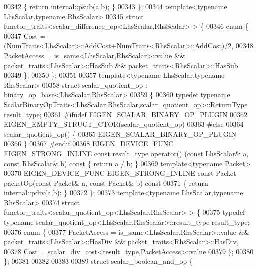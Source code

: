 \begin{DoxyCode}
00342 \textcolor{keyword}{  }\{ \textcolor{keywordflow}{return} internal::psub(a,b); \}
00343 \};
00344 \textcolor{keyword}{template}<\textcolor{keyword}{typename} LhsScalar,\textcolor{keyword}{typename} RhsScalar>
00345 \textcolor{keyword}{struct }functor\_traits<scalar\_difference\_op<LhsScalar,RhsScalar> > \{
00346   \textcolor{keyword}{enum} \{
00347     Cost = (NumTraits<LhsScalar>::AddCost+NumTraits<RhsScalar>::AddCost)/2,
00348     PacketAccess = is\_same<LhsScalar,RhsScalar>::value && packet\_traits<LhsScalar>::HasSub && 
      packet\_traits<RhsScalar>::HasSub
00349   \};
00350 \};
00351 
00357 \textcolor{keyword}{template}<\textcolor{keyword}{typename} LhsScalar,\textcolor{keyword}{typename} RhsScalar>
00358 \textcolor{keyword}{struct }scalar\_quotient\_op  : binary\_op\_base<LhsScalar,RhsScalar>
00359 \{
00360   \textcolor{keyword}{typedef} \textcolor{keyword}{typename} ScalarBinaryOpTraits<LhsScalar,RhsScalar,scalar\_quotient\_op>::ReturnType result\_type;
00361 \textcolor{preprocessor}{#ifndef EIGEN\_SCALAR\_BINARY\_OP\_PLUGIN}
00362   EIGEN\_EMPTY\_STRUCT\_CTOR(scalar\_quotient\_op)
00363 \textcolor{preprocessor}{#else}
00364   scalar\_quotient\_op() \{
00365     EIGEN\_SCALAR\_BINARY\_OP\_PLUGIN
00366   \}
00367 \textcolor{preprocessor}{#endif}
00368   EIGEN\_DEVICE\_FUNC EIGEN\_STRONG\_INLINE \textcolor{keyword}{const} result\_type operator() (\textcolor{keyword}{const} LhsScalar& a, \textcolor{keyword}{const} RhsScalar& 
      b)\textcolor{keyword}{ const }\{ \textcolor{keywordflow}{return} a / b; \}
00369   \textcolor{keyword}{template}<\textcolor{keyword}{typename} Packet>
00370   EIGEN\_DEVICE\_FUNC EIGEN\_STRONG\_INLINE \textcolor{keyword}{const} Packet packetOp(\textcolor{keyword}{const} Packet& a, \textcolor{keyword}{const} Packet& b)\textcolor{keyword}{ const}
00371 \textcolor{keyword}{  }\{ \textcolor{keywordflow}{return} internal::pdiv(a,b); \}
00372 \};
00373 \textcolor{keyword}{template}<\textcolor{keyword}{typename} LhsScalar,\textcolor{keyword}{typename} RhsScalar>
00374 \textcolor{keyword}{struct }functor\_traits<scalar\_quotient\_op<LhsScalar,RhsScalar> > \{
00375   \textcolor{keyword}{typedef} \textcolor{keyword}{typename} scalar\_quotient\_op<LhsScalar,RhsScalar>::result\_type result\_type;
00376   \textcolor{keyword}{enum} \{
00377     PacketAccess = is\_same<LhsScalar,RhsScalar>::value && packet\_traits<LhsScalar>::HasDiv && 
      packet\_traits<RhsScalar>::HasDiv,
00378     Cost = scalar\_div\_cost<result\_type,PacketAccess>::value
00379   \};
00380 \};
00381 
00382 
00383 
00389 \textcolor{keyword}{struct }scalar\_boolean\_and\_op \{

\end{DoxyCode}
